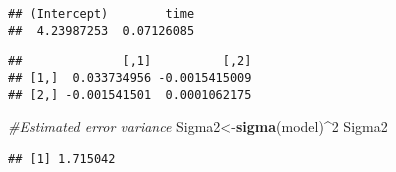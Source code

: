 \documentclass[]{article}
\newenvironment{Shaded}{\begin{snugshade}}{\end{snugshade}}
\newcommand{\KeywordTok}[1]{\textcolor[rgb]{0.13,0.29,0.53}{\textbf{#1}}}
\newcommand{\DataTypeTok}[1]{\textcolor[rgb]{0.13,0.29,0.53}{#1}}
\newcommand{\DecValTok}[1]{\textcolor[rgb]{0.00,0.00,0.81}{#1}}
\newcommand{\StringTok}[1]{\textcolor[rgb]{0.31,0.60,0.02}{#1}}
\newcommand{\CommentTok}[1]{\textcolor[rgb]{0.56,0.35,0.01}{\textit{#1}}}
\newcommand{\OperatorTok}[1]{\textcolor[rgb]{0.81,0.36,0.00}{\textbf{#1}}}
\newcommand{\NormalTok}[1]{#1}
\begin{document}
\begin{Shaded}
\end{Shaded}

\begin{verbatim}
## (Intercept)        time 
##  4.23987253  0.07126085
\end{verbatim}

\begin{Shaded}
\end{Shaded}

\begin{verbatim}
##              [,1]          [,2]
## [1,]  0.033734956 -0.0015415009
## [2,] -0.001541501  0.0001062175
\end{verbatim}

\begin{Shaded}
\begin{Highlighting}[]
\CommentTok{#Estimated error variance}
\NormalTok{Sigma2<-}\KeywordTok{sigma}\NormalTok{(model)}\OperatorTok{^}\DecValTok{2}
\NormalTok{Sigma2}
\end{Highlighting}
\end{Shaded}

\begin{verbatim}
## [1] 1.715042
\end{verbatim}
\end{document}
